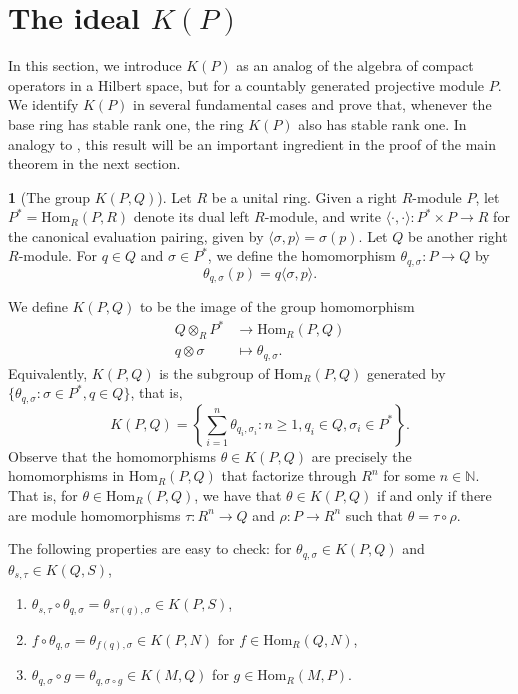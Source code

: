 \documentclass[11pt]{amsart}
\numberwithin{equation}{section}
\theoremstyle{definition}
\newtheorem{pgr}[pgrCt]{}
\theoremstyle{plain}
\theoremstyle{definition}
\begin{document}
\section{The ideal $K(P)$}

In this section, we introduce $K(P)$ as an analog of the algebra of compact operators in a Hilbert space, but for a countably generated projective module $P$. We identify $K(P)$ in several fundamental cases and prove that, whenever the base ring has stable rank one, the ring $K(P)$ also has stable rank one. In analogy to \cite{CowEllIva08CuInv}, this result will be an important ingredient in the proof of the main theorem in the next section. 

\begin{pgr}[The group $K(P, Q)$] \label{def K(P)}
Let $R$ be a unital ring. Given a right $R$-module $P$, let $P^*=\mathrm{Hom}_R(P,R)$ denote its dual left $R$-module, and write $\langle \cdot, \cdot \rangle \colon P^* \times P \rightarrow R$ for the canonical evaluation pairing, given by $\langle \sigma, p \rangle = \sigma(p)$. Let $Q$ be another right $R$-module. For $q \in Q$ and $\sigma \in P^*$, we define the homomorphism $\theta_{q,\sigma} \colon P \rightarrow Q$ by $$\theta_{q,\sigma}(p) = q\langle\sigma,p\rangle.$$ 

We define $K(P,Q)$ to be the image of the group homomorphism
\begin{align*}
Q \otimes_R P^* & \longrightarrow \mathrm{Hom}_R(P, Q) \\
q \otimes \sigma & \longmapsto \theta_{q, \sigma}.
\end{align*}
Equivalently, $K(P,Q)$ is the subgroup of $\mathrm{Hom}_R(P, Q)$ generated by $\{ \theta_{q,\sigma} \colon \sigma \in P^*, q \in Q \}$, that is, 
\begin{equation*}
K(P, Q) = \left\{ \sum_{i = 1}^n \theta_{q_i, \sigma_i} \colon n \geq 1, q_i \in Q, \sigma_i \in P^* \right\}. 
\end{equation*}
Observe that the homomorphisms $\theta \in K(P, Q)$ are precisely the homomorphisms in $\mathrm{Hom}_R(P, Q)$ that factorize through $R^n$ for some $n \in \mathbb{N}$. That is, for $\theta \in \mathrm{Hom}_R(P, Q)$, we have that $\theta \in K(P, Q)$ if and only if there are module homomorphisms $\tau \colon R^n \rightarrow Q$ and $\rho \colon P \rightarrow R^n$ such that $\theta = \tau \circ \rho$.  

The following properties are easy to check: for $\theta_{q, \sigma} \in K(P,Q)$ and $\theta_{s, \tau} \in K(Q,S)$,
\begin{enumerate}[label=(\roman*)]
\item $\theta_{s, \tau}\circ\theta_{q,\sigma} = \theta_{s\tau(q), \sigma} \in K(P, S)$,
\item $f \circ \theta_{q,\sigma} = \theta_{f(q),\sigma} \in K(P, N)$ for $f \in \mathrm{Hom}_R(Q, N)$,
\item $\theta_{q,\sigma} \circ g = \theta_{q,\sigma\circ g} \in K(M, Q)$ for $g \in \mathrm{Hom}_R(M, P)$. 
\end{enumerate}


\end{pgr}
\end{document}
